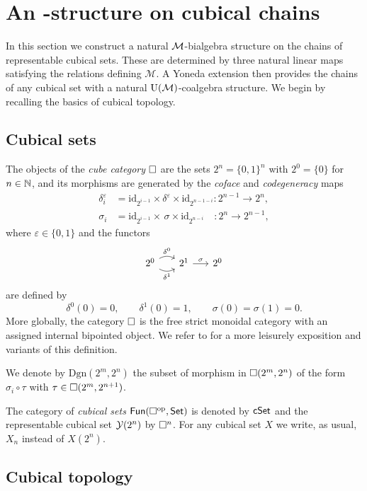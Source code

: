 \section{An \pdfEinfty-structure on cubical chains} \label{s:action}

In this section we construct a natural $\mathcal{M}$-bialgebra structure on the chains of representable cubical sets.
These are determined by three natural linear maps satisfying the relations defining $\mathcal M$.
A Yoneda extension then provides the chains of any cubical set with a natural ${\operatorname{U}(\mathcal{M})}$-coalgebra structure.
We begin by recalling the basics of cubical topology.

\subsection{Cubical sets}

The objects of the \textit{cube category} $\square$ are the sets $2^n = \{0, 1\}^n$ with $2^0 = \{0\}$ for $n \in \mathbb{N}$, and its morphisms are generated by the \textit{coface} and \textit{codegeneracy} maps
\begin{align*}
\delta_i^\varepsilon & = \mathrm{id}_{2^{i-1}} \times \delta^\varepsilon \times \mathrm{id}_{2^{n-1-i}} \colon 2^{n-1} \to 2^n, \\
\sigma_i & = \mathrm{id}_{2^{i-1}} \times \, \sigma \times \mathrm{id}_{2^{n-i}} \quad \colon 2^{n} \to 2^{n-1},
\end{align*}
where $\varepsilon \in \{0,1\}$ and the functors
\[
\begin{tikzcd} [column sep=16pt]
2^0 \arrow[r, bend left, "\delta^0"] \arrow[r, bend right, "\delta^1"'] & 2^1 \arrow[r, "\sigma"] & 2^0
\end{tikzcd}
\]
are defined by
\[
\delta^0(0) = 0, \qquad \delta^1(0) = 1, \qquad \sigma(0) = \sigma(1) = 0.
\]
More globally, the category $\square$ is the free strict monoidal category with an assigned internal bipointed object.
We refer to \cite{grandis2003cubical} for a more leisurely exposition and variants of this definition.

We denote by $\mathrm{Dgn}(2^m, 2^n)$ the subset of morphism in $\square(2^m, 2^n)$ of the form $\sigma_i \circ \tau$ with $\tau \in \square(2^m, 2^{n+1})$.

The category of \textit{cubical sets} $\mathsf{Fun}(\square^{\mathrm{op}}, \mathsf{Set})$ is denoted by $\mathsf{cSet}$ and the representable cubical set $\operatorname{\mathcal{Y}}(2^n)$ by $\square^n$.
For any cubical set $X$ we write, as usual, $X_n$ instead of $X(2^n)$.

\subsection{Cubical topology}

